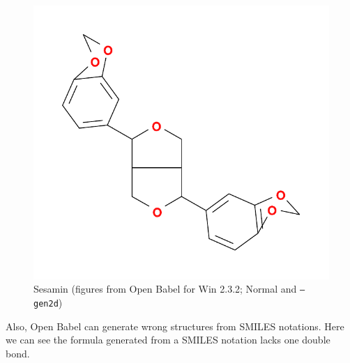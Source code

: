 \documentclass[12pt]{ltjsarticle}
\begin{document}
\begin{figure}[p]
\begin{center}
  \includegraphics[scale=0.5]{figures/Win232-sesamin-gen2d.pdf}
  \caption{Sesamin (figures from Open Babel for Win 2.3.2; Normal and \texttt{--gen2d})}
\end{center}
\end{figure}

\clearpage

Also, Open Babel can generate wrong structures from SMILES notations.
Here we can see the formula generated from a SMILES notation lacks one double bond.
\end{document}
